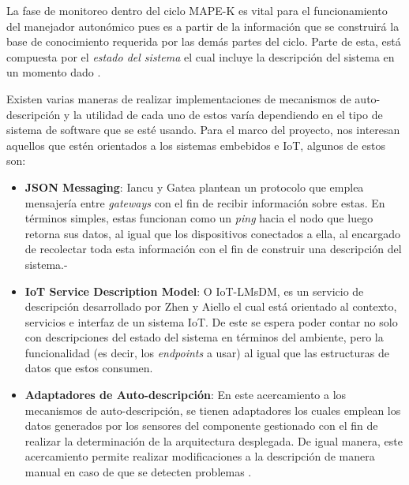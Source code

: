 \documentclass[12pt]{article}
\begin{document}

La fase de monitoreo dentro del ciclo MAPE-K es vital para el funcionamiento del manejador autonómico pues es a partir de la información que se construirá la base de conocimiento requerida por las demás partes del ciclo. Parte de esta, está compuesta por el \textit{estado del sistema} el cual incluye la descripción del sistema en un momento dado \cite{Weiss_2011}.

Existen varias maneras de realizar implementaciones de mecanismos de auto-descripción y la utilidad de cada uno de estos varía dependiendo en el tipo de sistema de software que se esté usando. Para el marco del proyecto, nos interesan aquellos que estén orientados a los sistemas embebidos e  IoT, algunos de estos son:

\begin{itemize}
	\item \textbf{JSON Messaging}: Iancu y Gatea \citeyear{Iancu_2022} plantean un protocolo que emplea mensajería entre \textit{gateways} con el fin de recibir información sobre estas. En términos simples, estas funcionan como un \textit{ping} hacia el nodo que luego retorna sus datos, al igual que los dispositivos conectados a ella, al encargado de recolectar toda esta información con el fin de construir una descripción del sistema.-

	\item \textbf{IoT Service Description Model}: O IoT-LMsDM, es un servicio de descripción desarrollado por Zhen y Aiello \citeyear{Wang_2021} el cual está orientado al contexto, servicios e interfaz de un sistema IoT. De este se espera poder contar no solo con descripciones del estado del sistema en términos del ambiente, pero la funcionalidad (es decir, los \textit{endpoints} a usar) al igual que las estructuras de datos que estos consumen.

	\item \textbf{Adaptadores de Auto-descripción}: En este acercamiento a los mecanismos de auto-descripción, se tienen adaptadores los cuales emplean los datos generados por los sensores del componente gestionado con el fin de realizar la determinación de la arquitectura desplegada. De igual manera, este acercamiento permite realizar modificaciones a la descripción de manera manual en caso de que se detecten problemas \cite{msc_henry_2022}.

\end{itemize}
\end{document}
